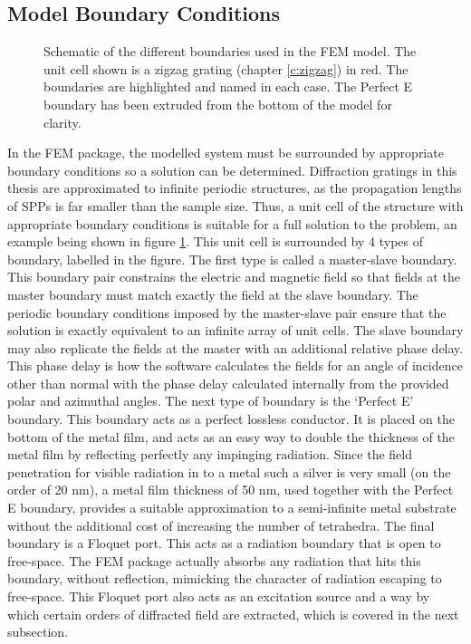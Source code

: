 \subsection{Model Boundary Conditions}
\begin{figure}[h]
\begin{center}

\end{center}
\caption[Schematic of the different boundaries used in the FEM model.]{Schematic of the different boundaries used in the FEM model. The unit cell shown is a zigzag grating (chapter \ref{c:zigzag}) in red. The boundaries are highlighted and named in each case. The Perfect E boundary has been extruded from the bottom of the model for clarity.}\label{fig:hfssunitcell}
\end{figure}
In the FEM package, the modelled system must be surrounded by appropriate boundary conditions so a solution can be determined. Diffraction gratings in this thesis are approximated to infinite periodic structures, as the propagation lengths of SPPs is far smaller than the sample size. Thus, a unit cell of the structure with appropriate boundary conditions is suitable for a full solution to the problem, an example being shown in figure \ref{fig:hfssunitcell}. This unit cell is surrounded by 4 types of boundary, labelled in the figure.
The first type is called a master-slave boundary. This boundary pair constrains  the electric and magnetic field so that fields at the master boundary must match exactly the field at the slave boundary. The periodic boundary conditions imposed by the master-slave pair ensure that the solution is exactly equivalent to an infinite array of unit cells. The slave boundary may also replicate the fields at the master with an additional relative phase delay. This phase delay is how the software calculates the fields for an angle of incidence other than normal with the phase delay calculated internally from the provided polar and azimuthal angles.
The next type of boundary is the `Perfect E' boundary. This boundary acts as a perfect lossless conductor. It is placed on the bottom of the metal film, and acts as an easy way to double the thickness of the metal film by reflecting perfectly any impinging radiation. Since the field penetration for visible radiation in to a metal such a silver is very small (on the order of 20 nm), a metal film thickness of 50 nm, used together with the Perfect E boundary, provides a suitable approximation to a semi-infinite metal substrate without the additional cost of increasing the number of tetrahedra.
The final boundary is a Floquet port. This acts as a radiation boundary that is open to free-space. The FEM package actually absorbs any radiation that hits this boundary, without reflection, mimicking the character of radiation escaping to free-space. This Floquet port also acts as an excitation source and a way by which certain orders of diffracted field are extracted, which is covered in the next subsection.

